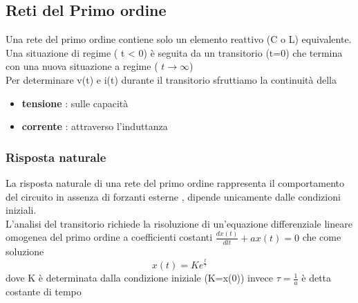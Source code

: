 \documentclass{article}
\theoremstyle{definition}
\begin{document}
\subsection{Reti del Primo ordine }
Una rete del primo ordine contiene solo un elemento reattivo (C o L) equivalente.\\
Una situazione di regime ( t < 0) è seguita da un transitorio (t=0) che termina con una nuova situazione a regime ( $ t \rightarrow \infty$)\\
Per determinare v(t) e i(t) durante il transitorio sfruttiamo la continuità della 
\begin{itemize}
\item \textbf{tensione} : sulle capacità
\item \textbf{corrente} : attraverso l'induttanza 
\end{itemize}
\subsubsection{Risposta naturale}
La risposta naturale di una rete del primo ordine rappresenta il comportamento del circuito in assenza di forzanti esterne , dipende unicamente dalle condizioni iniziali.\\
L'analisi del transitorio richiede la risoluzione di un'equazione differenziale lineare omogenea del primo ordine a coefficienti costanti  $\frac{ d x(t)}{dl t}+a x(t)=0$ che come soluzione $$x(t)=Ke^{\frac{t}{\tau}}$$ dove K è determinata dalla condizione iniziale (K=x(0))  invece $\tau=\frac{1}{a}$ è detta costante di tempo 
\end{document}
